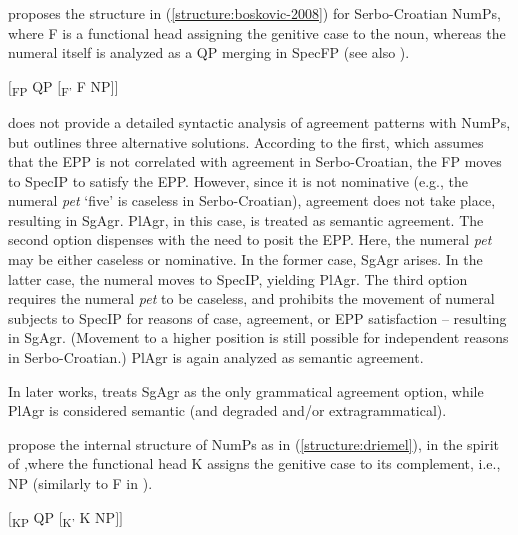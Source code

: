 \documentclass[output=paper,colorlinks,citecolor=brown
]{langscibook}
\begin{document}
\citet{Boskovic2008} proposes the structure in (\ref{structure:boskovic-2008}) for Serbo-Croatian NumPs, where F is a functional head assigning the genitive case to the noun, whereas the numeral itself is analyzed as a QP merging in SpecFP (see also \citealt{Boskovic2024}). 

\ea $[$\textsubscript{FP} QP $[$\textsubscript{F'} F NP$]$$]$ \label{structure:boskovic-2008} 
\z 

\noindent \citeauthor{Boskovic2008} does not provide a detailed syntactic analysis of agreement patterns with NumPs, but outlines three alternative solutions. According to the first, which assumes that the EPP is not correlated with agreement in Serbo-Croatian, the FP moves to SpecIP to satisfy the EPP. However, since it is not nominative (e.g., the numeral \textit{pet} `five' is caseless in Serbo-Croatian), agreement does not take place, resulting in SgAgr. PlAgr, in this case, is treated as semantic agreement.
The second option dispenses with the need to posit the EPP. Here, the numeral \textit{pet} may be either caseless or nominative. In the former case, SgAgr arises. In the latter case, the numeral moves to SpecIP, yielding PlAgr.
The third option requires the numeral \textit{pet} to be caseless, and prohibits the movement of numeral subjects to SpecIP for reasons of case, agreement, or EPP satisfaction -- resulting in SgAgr. (Movement to a higher position is still possible for independent reasons in Serbo-Croatian.) PlAgr is again analyzed as semantic agreement.

In later works, \citet{Boskovic2013, Boskovic2024} treats SgAgr as the only grammatical agreement option, while PlAgr is considered semantic (and degraded and/or extragrammatical).





\citet{Driemel2019} propose the internal structure of NumPs as in (\ref{structure:driemel}), in the spirit of \citet{Boskovic2008},where the functional head K assigns the genitive case to its complement, i.e., NP (similarly to F in \citealt{Boskovic2008}).

\ea $[$\textsubscript{KP} QP $[$\textsubscript{K'} K NP$]$$]$ \label{structure:driemel}
\z
\end{document}
